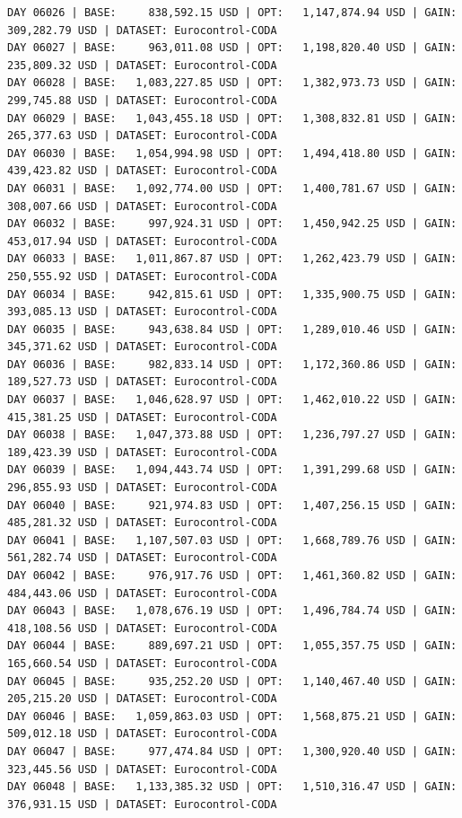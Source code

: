 \documentclass[11pt,a4paper]{article}
\begin{document}
\begin{verbatim}
DAY 06026 | BASE:     838,592.15 USD | OPT:   1,147,874.94 USD | GAIN: 309,282.79 USD | DATASET: Eurocontrol-CODA
DAY 06027 | BASE:     963,011.08 USD | OPT:   1,198,820.40 USD | GAIN: 235,809.32 USD | DATASET: Eurocontrol-CODA
DAY 06028 | BASE:   1,083,227.85 USD | OPT:   1,382,973.73 USD | GAIN: 299,745.88 USD | DATASET: Eurocontrol-CODA
DAY 06029 | BASE:   1,043,455.18 USD | OPT:   1,308,832.81 USD | GAIN: 265,377.63 USD | DATASET: Eurocontrol-CODA
DAY 06030 | BASE:   1,054,994.98 USD | OPT:   1,494,418.80 USD | GAIN: 439,423.82 USD | DATASET: Eurocontrol-CODA
DAY 06031 | BASE:   1,092,774.00 USD | OPT:   1,400,781.67 USD | GAIN: 308,007.66 USD | DATASET: Eurocontrol-CODA
DAY 06032 | BASE:     997,924.31 USD | OPT:   1,450,942.25 USD | GAIN: 453,017.94 USD | DATASET: Eurocontrol-CODA
DAY 06033 | BASE:   1,011,867.87 USD | OPT:   1,262,423.79 USD | GAIN: 250,555.92 USD | DATASET: Eurocontrol-CODA
DAY 06034 | BASE:     942,815.61 USD | OPT:   1,335,900.75 USD | GAIN: 393,085.13 USD | DATASET: Eurocontrol-CODA
DAY 06035 | BASE:     943,638.84 USD | OPT:   1,289,010.46 USD | GAIN: 345,371.62 USD | DATASET: Eurocontrol-CODA
DAY 06036 | BASE:     982,833.14 USD | OPT:   1,172,360.86 USD | GAIN: 189,527.73 USD | DATASET: Eurocontrol-CODA
DAY 06037 | BASE:   1,046,628.97 USD | OPT:   1,462,010.22 USD | GAIN: 415,381.25 USD | DATASET: Eurocontrol-CODA
DAY 06038 | BASE:   1,047,373.88 USD | OPT:   1,236,797.27 USD | GAIN: 189,423.39 USD | DATASET: Eurocontrol-CODA
DAY 06039 | BASE:   1,094,443.74 USD | OPT:   1,391,299.68 USD | GAIN: 296,855.93 USD | DATASET: Eurocontrol-CODA
DAY 06040 | BASE:     921,974.83 USD | OPT:   1,407,256.15 USD | GAIN: 485,281.32 USD | DATASET: Eurocontrol-CODA
DAY 06041 | BASE:   1,107,507.03 USD | OPT:   1,668,789.76 USD | GAIN: 561,282.74 USD | DATASET: Eurocontrol-CODA
DAY 06042 | BASE:     976,917.76 USD | OPT:   1,461,360.82 USD | GAIN: 484,443.06 USD | DATASET: Eurocontrol-CODA
DAY 06043 | BASE:   1,078,676.19 USD | OPT:   1,496,784.74 USD | GAIN: 418,108.56 USD | DATASET: Eurocontrol-CODA
DAY 06044 | BASE:     889,697.21 USD | OPT:   1,055,357.75 USD | GAIN: 165,660.54 USD | DATASET: Eurocontrol-CODA
DAY 06045 | BASE:     935,252.20 USD | OPT:   1,140,467.40 USD | GAIN: 205,215.20 USD | DATASET: Eurocontrol-CODA
DAY 06046 | BASE:   1,059,863.03 USD | OPT:   1,568,875.21 USD | GAIN: 509,012.18 USD | DATASET: Eurocontrol-CODA
DAY 06047 | BASE:     977,474.84 USD | OPT:   1,300,920.40 USD | GAIN: 323,445.56 USD | DATASET: Eurocontrol-CODA
DAY 06048 | BASE:   1,133,385.32 USD | OPT:   1,510,316.47 USD | GAIN: 376,931.15 USD | DATASET: Eurocontrol-CODA

\end{verbatim}
\end{document}
